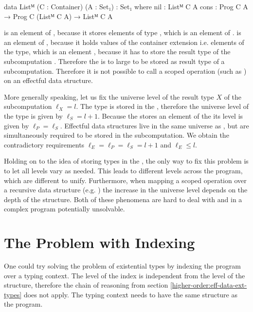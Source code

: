 \begin{code}
data Listᴹ (C : Container) (A : Set₁) : Set₁ where
  nil   : Listᴹ C A
  cons  : Prog C A → Prog C (Listᴹ C A) → Listᴹ C A
\end{code}
\AgdaSpace{}\AgdaSpace{} is
an element of , because it stores elements of type
\AgdaSpace{}\AgdaSpace{},
which is an element of .
\AgdaSpace{}\AgdaSpace{} is
an element of , because it holds values of the container
extension i.e. elements of the  type, which is an element
, because it has to store the result type of the
subcomputation .
Therefore the
\AgdaSpace{}\AgdaSpace{} is
to large to be stored as result type of a subcomputation.
Therefore it is not possible to call a scoped operation (such as
) on an effectful data structure.

More generally speaking, let us fix the universe level of the result type $X$ of
the subcomputation $\ell_X = l$.
The type is stored in the , therefore the universe level of the
 type is given by $\ell_S = l + 1$.
Because the  stores an element of the  its
level is given by $\ell_P = \ell_S$.
Effectful data structures live in the same universe as , but
are simultaneously required to be stored in the subcomputation.
We obtain the contradictory requirements $\ell_E = \ell_P = \ell_S = l + 1$ and
$\ell_E  \leqslant l$.

Holding on to the idea of storing types in the , the only way to
fix this problem is to let all levels vary as needed.
This leads to different levels across the program, which are different to unify.
Furthermore, when mapping a scoped operation over a recursive data structure
(e.g. ) the increase in the universe level depends on the
depth of the structure.
Both of these phenomena are hard to deal with and in a complex program
potentially unsolvable.


\section{The Problem with Indexing}

One could try solving the problem of existential types by indexing the program
over a typing context.
The level of the index is independent from the level of the structure, therefore
the chain of reasoning from section \ref{higher-order:eff-data-ext-types} does
not apply.
The typing context needs to have the same structure as the program.

